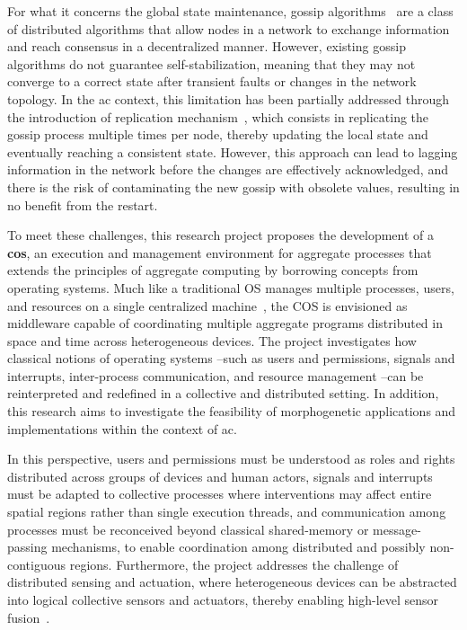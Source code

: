 \documentclass[runningheads]{llncs}
\begin{document}
    For what it concerns the global state maintenance,
    gossip algorithms~\cite{DBLP:journals/csur/KermarrecM07} are a class of distributed algorithms that allow nodes in a network to exchange information and reach consensus in a decentralized manner.
    However,
    existing gossip algorithms do not guarantee self-stabilization,
    meaning that they may not converge to a correct state after transient faults or changes in the network topology.
    In the \ac{ac} context,
    this limitation has been partially addressed through the introduction of replication mechanism~\cite{PianiniCoordination2016},
    which consists in replicating the gossip process multiple times per node,
    thereby updating the local state and eventually reaching a consistent state.
    However,
    this approach can lead to lagging information in the network before the changes are effectively acknowledged,
    and there is the risk of contaminating the new gossip with obsolete values, resulting in no benefit from the restart.

    To meet these challenges,
    this research project proposes the development of a \textbf{\ac{cos}},
    an execution and management environment for aggregate processes that extends the principles of aggregate computing by borrowing concepts from operating systems.
    Much like a traditional OS manages multiple processes, users,
    and resources on a single centralized machine~\cite{DBLP:journals/csur/TanenbaumR85},
    the COS is envisioned as middleware capable of coordinating multiple aggregate programs distributed in space and time across heterogeneous devices.
    The project investigates how classical notions of operating systems --such as users and permissions, signals and interrupts,
    inter-process communication, and resource management --can be reinterpreted and redefined in a collective and distributed setting.
    In addition,
    this research aims to investigate the feasibility of morphogenetic applications and implementations within the context of \ac{ac}.

    In this perspective,
    users and permissions must be understood as roles and rights distributed across groups of devices and human actors,
    signals and interrupts must be adapted to collective processes where interventions may affect entire spatial regions rather than single execution threads,
    and communication among processes must be reconceived beyond classical shared-memory or message-passing mechanisms,
    to enable coordination among distributed and possibly non-contiguous regions.
    Furthermore,
    the project addresses the challenge of distributed sensing and actuation,
    where heterogeneous devices can be abstracted into logical collective sensors and actuators,
    thereby enabling high-level sensor fusion~\cite{DBLP:journals/arc/Sasiadek02}.
\end{document}
